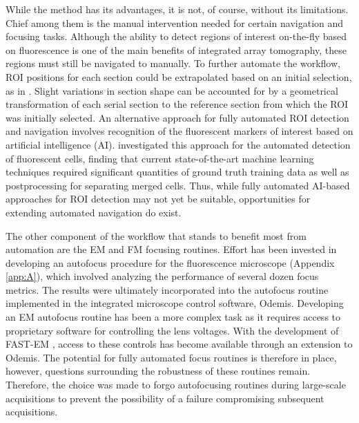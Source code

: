 While the method has its advantages, it is not, of course, without its limitations. Chief among them is the manual intervention needed for certain navigation and focusing tasks. Although the ability to detect regions of interest on-the-fly based on fluorescence is one of the main benefits of integrated array tomography, these regions must still be navigated to manually. To further automate the workflow, ROI positions for each section could be extrapolated based on an initial selection, as in \textcite{gabarre2021workflow}. Slight variations in section shape can be accounted for by a geometrical transformation of each serial section to the reference section from which the ROI was initially selected. An alternative approach for fully automated ROI detection and navigation involves recognition of the fluorescent markers of interest based on artificial intelligence (AI). \textcite{delpiano2018automated} investigated this approach for the automated detection of fluorescent cells, finding that current state-of-the-art machine learning techniques required significant quantities of ground truth training data as well as postprocessing for separating merged cells. Thus, while fully automated AI-based approaches for ROI detection may not yet be suitable, opportunities for extending automated navigation do exist.

The other component of the workflow that stands to benefit most from automation are the EM and FM focusing routines. Effort has been invested in developing an autofocus procedure for the fluorescence microscope (Appendix \ref{app:A}), which involved analyzing the performance of several dozen focus metrics. The results were ultimately incorporated into the autofocus routine implemented in the integrated microscope control software, Odemis. Developing an EM autofocus routine has been a more complex task as it requires access to proprietary software for controlling the lens voltages. With the development of FAST-EM \cite{fermie2021high}, access to these controls has become available through an extension to Odemis. The potential for fully automated focus routines is therefore in place, however, questions surrounding the robustness of these routines remain. Therefore, the choice was made to forgo autofocusing routines during large-scale acquisitions to prevent the possibility of a failure compromising subsequent acquisitions.

